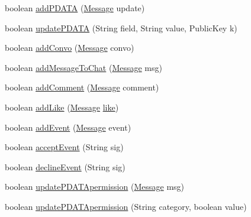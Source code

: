 \begin{DoxyCompactItemize}
boolean \hyperlink{classballmerpeak_1_1turtlenet_1_1server_1_1Database_a051ccb269be2f30af05fe554b83597a5}{add\-P\-D\-A\-T\-A} (\hyperlink{classballmerpeak_1_1turtlenet_1_1shared_1_1Message}{Message} update)
\item 
boolean \hyperlink{classballmerpeak_1_1turtlenet_1_1server_1_1Database_a54a5e6c02389fb8f3528bf503019f7fe}{update\-P\-D\-A\-T\-A} (String field, String value, Public\-Key k)
\item 
boolean \hyperlink{classballmerpeak_1_1turtlenet_1_1server_1_1Database_a4a18cb43547e71e48bbf7269b3e5d560}{add\-Convo} (\hyperlink{classballmerpeak_1_1turtlenet_1_1shared_1_1Message}{Message} convo)
\item 
boolean \hyperlink{classballmerpeak_1_1turtlenet_1_1server_1_1Database_a42de72fca336efc18a3c486749289b50}{add\-Message\-To\-Chat} (\hyperlink{classballmerpeak_1_1turtlenet_1_1shared_1_1Message}{Message} msg)
\item 
boolean \hyperlink{classballmerpeak_1_1turtlenet_1_1server_1_1Database_a1bfae51747f69a2dd125d9c915b980d4}{add\-Comment} (\hyperlink{classballmerpeak_1_1turtlenet_1_1shared_1_1Message}{Message} comment)
\item 
boolean \hyperlink{classballmerpeak_1_1turtlenet_1_1server_1_1Database_af22fa4b19c7863929894a3ed278a174c}{add\-Like} (\hyperlink{classballmerpeak_1_1turtlenet_1_1shared_1_1Message}{Message} \hyperlink{classballmerpeak_1_1turtlenet_1_1server_1_1Database_ac2c2361722304a6446d5cd01cb0c5d3b}{like})
\item 
boolean \hyperlink{classballmerpeak_1_1turtlenet_1_1server_1_1Database_a484dad4e2e272c608996a4a6bbb463a4}{add\-Event} (\hyperlink{classballmerpeak_1_1turtlenet_1_1shared_1_1Message}{Message} event)
\item 
boolean \hyperlink{classballmerpeak_1_1turtlenet_1_1server_1_1Database_a30d0cd474644f531f6bfded6c9a63506}{accept\-Event} (String sig)
\item 
boolean \hyperlink{classballmerpeak_1_1turtlenet_1_1server_1_1Database_a2618960f1f28ee6fb130fba5077d8088}{decline\-Event} (String sig)
\item 
boolean \hyperlink{classballmerpeak_1_1turtlenet_1_1server_1_1Database_ae65d70bab4c0fba8f0c941487385c8c9}{update\-P\-D\-A\-T\-Apermission} (\hyperlink{classballmerpeak_1_1turtlenet_1_1shared_1_1Message}{Message} msg)
\item 
boolean \hyperlink{classballmerpeak_1_1turtlenet_1_1server_1_1Database_aed151a8daa6202838bdc8b949d6de05c}{update\-P\-D\-A\-T\-Apermission} (String category, boolean value)

\end{DoxyCompactItemize}
